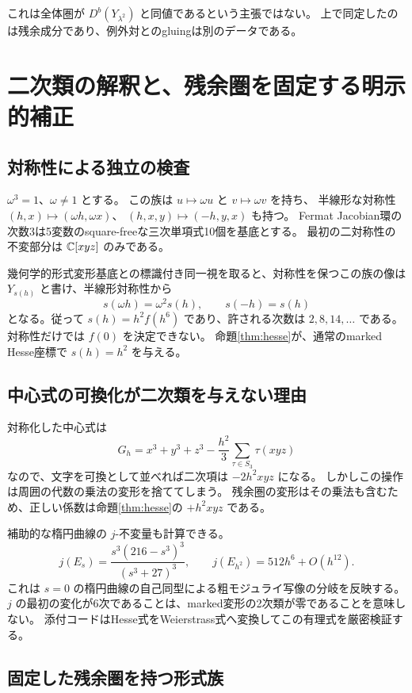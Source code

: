 これは全体圏が $D^b(Y_{\lambda^2})$ と同値であるという主張ではない。
上で同定したのは残余成分であり、例外対とのgluingは別のデータである。

\section{二次類の解釈と、残余圏を固定する明示的補正}

\subsection{対称性による独立の検査}

$\omega^3=1$、$\omega\ne1$ とする。
この族は $u\mapsto\omega u$ と $v\mapsto\omega v$ を持ち、
半線形な対称性 $(h,x)\mapsto(\omega h,\omega x)$、
$(h,x,y)\mapsto(-h,y,x)$ も持つ。
Fermat Jacobian環の次数3は5変数のsquare-freeな三次単項式10個を基底とする。
最初の二対称性の不変部分は $\mathbb C[xyz]$ のみである。

幾何学的形式変形基底との標識付き同一視を取ると、対称性を保つこの族の像は
$Y_{s(h)}$ と書け、半線形対称性から
\[
 s(\omega h)=\omega^2s(h),\qquad s(-h)=s(h)
\]
となる。従って $s(h)=h^2f(h^6)$ であり、許される次数は $2,8,14,\ldots$ である。
対称性だけでは $f(0)$ を決定できない。
命題\ref{thm:hesse}が、通常のmarked Hesse座標で $s(h)=h^2$ を与える。

\subsection{中心式の可換化が二次類を与えない理由}

対称化した中心式は
\[
 G_h=x^3+y^3+z^3-\frac{h^2}{3}\sum_{\tau\in S_3}\tau(xyz)
\]
なので、文字を可換として並べれば二次項は $-2h^2xyz$ になる。
しかしこの操作は周囲の代数の乗法の変形を捨ててしまう。
残余圏の変形はその乗法も含むため、正しい係数は命題\ref{thm:hesse}の
$+h^2xyz$ である。

補助的な楕円曲線の $j$-不変量も計算できる。
\[
 j(E_s)=\frac{s^3(216-s^3)^3}{(s^3+27)^3},\qquad
 j(E_{h^2})=512h^6+O(h^{12}).
\]
これは $s=0$ の楕円曲線の自己同型による粗モジュライ写像の分岐を反映する。
$j$ の最初の変化が6次であることは、marked変形の2次類が零であることを意味しない。
添付コードはHesse式をWeierstrass式へ変換してこの有理式を厳密検証する。

\subsection{固定した残余圏を持つ形式族}

